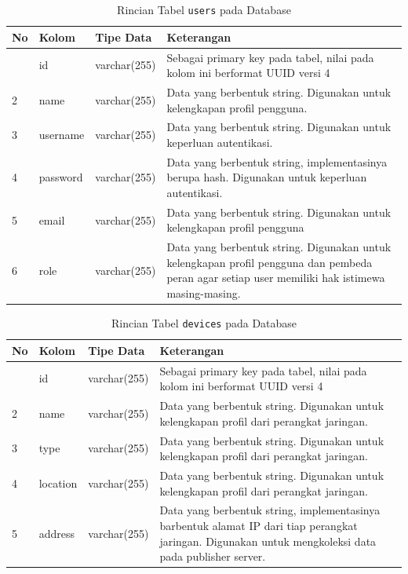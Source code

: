     	\begin{longtable}{|p{}|p{}|p{}|p{}|} %
    		
    		\caption{Rincian Tabel \texttt{users} pada Database} \label{tabeldbusers} \\
    		\hline
    		\textbf{No} & \textbf{Kolom} & \textbf{Tipe Data} & \textbf{Keterangan} \\ \hline
    		\endhead
    		\endfoot
    		\endlastfoot
    		1 & id & varchar(255) & Sebagai primary key pada tabel, nilai pada kolom ini berformat UUID versi 4 \\ \hline
    		2 & name & varchar(255) & Data yang berbentuk string. Digunakan untuk kelengkapan profil pengguna. \\ \hline
    		3 & username & varchar(255) & Data yang berbentuk string. Digunakan untuk keperluan autentikasi. \\ \hline
    		4 & password & varchar(255) & Data yang berbentuk string, implementasinya berupa hash. Digunakan untuk keperluan autentikasi. \\ \hline
    		5 & email & varchar(255) & Data yang berbentuk string. Digunakan untuk kelengkapan profil pengguna \\ \hline
    		6 & role & varchar(255) & Data yang berbentuk string. Digunakan untuk kelengkapan profil pengguna dan pembeda peran agar setiap user memiliki hak istimewa masing-masing. \\ \hline
    	\end{longtable}
    	
    	\begin{longtable}{|p{}|p{}|p{}|p{}|} %
    		
    		\caption{Rincian Tabel \texttt{devices} pada Database} \label{tabeldbdevices} \\
    		\hline
    		\textbf{No} & \textbf{Kolom} & \textbf{Tipe Data} & \textbf{Keterangan} \\ \hline
    		\endhead
    		\endfoot
    		\endlastfoot
    		1 & id & varchar(255) & Sebagai primary key pada tabel, nilai pada kolom ini berformat UUID versi 4 \\ \hline
    		2 & name & varchar(255) & Data yang berbentuk string. Digunakan untuk kelengkapan profil dari perangkat jaringan. \\ \hline
    		3 & type & varchar(255) & Data yang berbentuk string. Digunakan untuk kelengkapan profil dari perangkat jaringan. \\ \hline
    		4 & location & varchar(255) & Data yang berbentuk string. Digunakan untuk kelengkapan profil dari perangkat jaringan. \\ \hline
    		5 & address & varchar(255) & Data yang berbentuk string, implementasinya barbentuk alamat IP dari tiap perangkat jaringan. Digunakan untuk mengkoleksi data pada publisher server. \\ \hline
    	\end{longtable}
    
